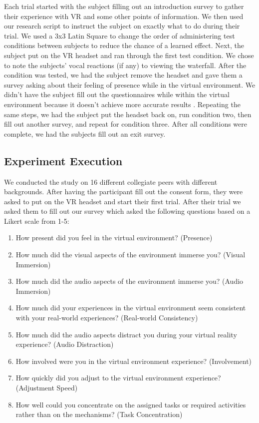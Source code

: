 \documentclass[manuscript,screen,review]{acmart}
\begin{document}
Each trial started with the subject filling out an introduction survey to gather their experience with VR and some other points of information. We then used our research script to instruct the subject on exactly what to do during their trial. We used a 3x3 Latin Square to change the order of administering test conditions between subjects to reduce the chance of a learned effect. Next, the subject put on the VR headset and ran through the first test condition. We chose to note the subjects' vocal reactions (if any) to viewing the waterfall. After the condition was tested, we had the subject remove the headset and gave them a survey asking about their feeling of presence while in the virtual environment. We didn’t have the subject fill out the questionnaires while within the virtual environment because it doesn’t achieve more accurate results \cite{THAKKAR}. Repeating the same steps, we had the subject put the headset back on, run condition two, then fill out another survey, and repeat for condition three. After all conditions were complete, we had the subjects fill out an exit survey. 

\subsection{Experiment Execution}
We conducted the study on 16 different collegiate peers with different backgrounds. After having the participant fill out the consent form, they were asked to put on the VR headset and start their first trial. After their trial we asked them to fill out our survey which asked the following questions based on a Likert scale from 1-5: 

\begin{enumerate}
  \item How present did you feel in the virtual environment? (Presence)
  
  \item How much did the visual aspects of the environment immerse you? (Visual Immersion)
  
  \item How much did the audio aspects of the environment immerse you? (Audio Immersion)
  
  \item How much did your experiences in the virtual environment seem consistent with your real-world experiences? (Real-world Consistency)

  \item How much did the audio aspects distract you during your virtual reality experience? (Audio Distraction)

  \item How involved were you in the virtual environment experience? (Involvement)

  \item How quickly did you adjust to the virtual environment experience? (Adjustment Speed)

  \item How well could you concentrate on the assigned tasks or required activities rather than on the mechanisms? (Task Concentration)
  
\end{enumerate}
\end{document}
